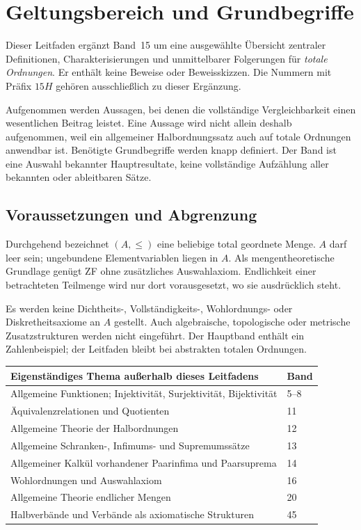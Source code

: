 \chapter{Geltungsbereich und Grundbegriffe}
\label{b15guide:ch:foundations}

Dieser Leitfaden ergänzt Band~15 um eine ausgewählte Übersicht
zentraler Definitionen, Charakterisierungen und unmittelbarer
Folgerungen für \emph{totale Ordnungen}. Er enthält keine Beweise
oder Beweisskizzen. Die Nummern mit Präfix $15H$ gehören
ausschließlich zu dieser Ergänzung.

Aufgenommen werden Aussagen, bei denen die vollständige
Vergleichbarkeit einen wesentlichen Beitrag leistet. Eine Aussage
wird nicht allein deshalb aufgenommen, weil ein allgemeiner
Halbordnungssatz auch auf totale Ordnungen anwendbar ist.
Benötigte Grundbegriffe werden knapp definiert.
Der Band ist eine Auswahl bekannter Hauptresultate, keine
vollständige Aufzählung aller bekannten oder ableitbaren Sätze.

\section{Voraussetzungen und Abgrenzung}

Durchgehend bezeichnet $(A,\leq)$ eine beliebige total geordnete
Menge. $A$ darf leer sein; ungebundene Elementvariablen liegen
in $A$. Als mengentheoretische Grundlage genügt ZF ohne
zusätzliches Auswahlaxiom. Endlichkeit einer betrachteten
Teilmenge wird nur dort vorausgesetzt, wo sie ausdrücklich steht.

Es werden keine Dichtheits-, Vollständigkeits-, Wohlordnungs-
oder Diskretheitsaxiome an $A$ gestellt. Auch algebraische,
topologische oder metrische Zusatzstrukturen werden nicht
eingeführt. Der Hauptband enthält ein Zahlenbeispiel;
der Leitfaden bleibt bei abstrakten totalen Ordnungen.

\begin{center}
\small
\begin{tabularx}{\linewidth}{@{}p{.72\linewidth}X@{}}
\toprule
Eigenständiges Thema außerhalb dieses Leitfadens & Band\\
\midrule
Allgemeine Funktionen; Injektivität, Surjektivität, Bijektivität & 5--8\\
Äquivalenzrelationen und Quotienten & 11\\
Allgemeine Theorie der Halbordnungen & 12\\
Allgemeine Schranken-, Infimums- und Supremumssätze & 13\\
Allgemeiner Kalkül vorhandener Paarinfima und Paarsuprema & 14\\
Wohlordnungen und Auswahlaxiom & 16\\
Allgemeine Theorie endlicher Mengen & 20\\
Halbverbände und Verbände als axiomatische Strukturen & 45\\
\bottomrule
\end{tabularx}
\end{center}

